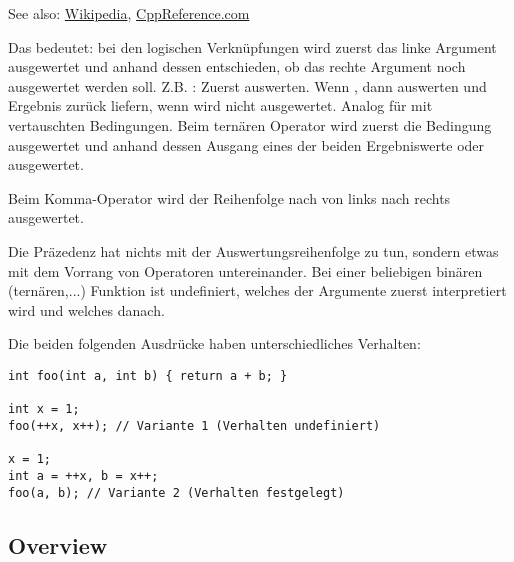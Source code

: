 {See also: \href{http://en.wikipedia.org/wiki/Sequence_point}{Wikipedia}, \href{http://en.cppreference.com/w/cpp/language/eval_order}{CppReference.com}

Das bedeutet: bei den logischen Verknüpfungen wird zuerst das linke Argument ausgewertet und anhand dessen entschieden, ob das rechte Argument noch ausgewertet werden soll. Z.B. : Zuerst  auswerten. Wenn , dann  auswerten und Ergebnis zurück liefern, wenn  wird  nicht ausgewertet. Analog für  mit vertauschten Bedingungen. Beim ternären Operator  wird zuerst die Bedingung  ausgewertet und anhand dessen Ausgang eines der beiden Ergebniswerte  oder  ausgewertet.

Beim Komma-Operator wird der Reihenfolge nach von links nach rechts ausgewertet.

\begin{rem}
Die Präzedenz hat nichts mit der Auswertungsreihenfolge zu tun, sondern etwas mit dem Vorrang von Operatoren untereinander. Bei einer beliebigen binären (ternären,...) Funktion ist undefiniert, welches der Argumente zuerst interpretiert wird und welches danach.
\end{rem}

\begin{example}
Die beiden folgenden Ausdrücke haben unterschiedliches Verhalten:
\begin{verbatim}
int foo(int a, int b) { return a + b; }

int x = 1;
foo(++x, x++); // Variante 1 (Verhalten undefiniert)

x = 1;
int a = ++x, b = x++;
foo(a, b); // Variante 2 (Verhalten festgelegt)
\end{verbatim}
\end{example}

\subsection*{Overview}

}
